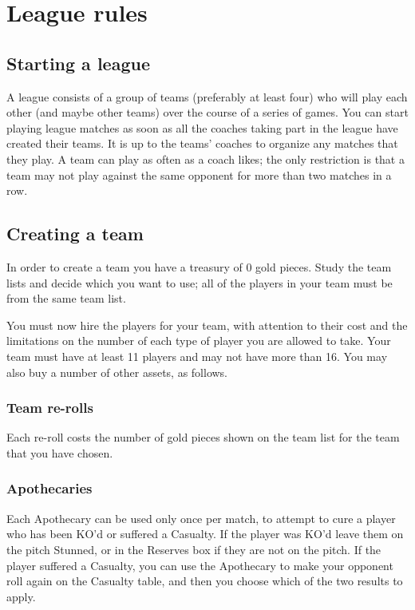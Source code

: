 \section{League rules}

\subsection{Starting a league}
\par A league consists of a group of teams (preferably at least four) who will play each other (and maybe other teams) over the course of a series of games. You can start playing league matches as soon as all the coaches taking part in the league have created their teams. It is up to the teams' coaches to organize any matches that they play. A team can play as often as a coach likes; the only restriction is that a team may not play against the same opponent for more than two matches in a row.

\subsection{Creating a team}
\par In order to create a team you have a treasury of 0 gold pieces. Study the team lists and decide which you want to use; all of the players in your team must be from the same team list.
\par You must now hire the players for your team, with attention to their cost and the limitations on the number of each type of player you are allowed to take. Your team must have at least 11 players and may not have more than 16. You may also buy a number of other assets, as follows.

\subsubsection{Team re-rolls}
\par Each re-roll costs the number of gold pieces shown on the team list for the team that you have chosen.

\subsubsection{Apothecaries}
\par Each Apothecary can be used only once per match, to attempt to cure a player who has been KO'd or suffered a Casualty. If the player was KO'd leave them on the pitch Stunned, or in the Reserves box if they are not on the pitch. If the player suffered a Casualty, you can use the Apothecary to make your opponent roll again on the Casualty table, and then you choose which of the two results to apply.

